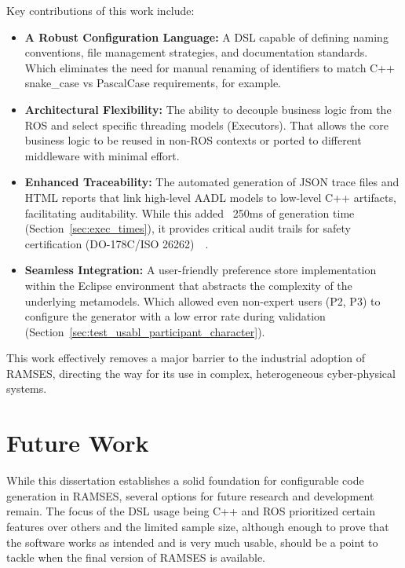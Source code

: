 Key contributions of this work include:

\begin{itemize} 
	\item \textbf{A Robust Configuration Language: } A \gls{DSL} capable of defining naming conventions, file management strategies, and documentation standards. Which eliminates the need for manual renaming of identifiers to match C++ snake\_case vs PascalCase requirements, for example.
	
	\item \textbf{Architectural Flexibility: } The ability to decouple business logic from the \gls{ROS} and select specific threading models (Executors). That allows the core business logic to be reused in non-\gls{ROS} contexts or ported to different middleware with minimal effort.
	
	\item \textbf{Enhanced Traceability: } The automated generation of \gls{JSON} trace files and \gls{HTML} reports that link high-level \gls{AADL} models to low-level C++ artifacts, facilitating auditability. While this added ~250ms of generation time (Section~\ref{sec:exec_times}), it provides critical audit trails for safety certification (DO-178C/\gls{ISO} 26262)~\cite{do178C}~\cite{iso26262}.
	
	\item \textbf{Seamless Integration: } A user-friendly preference store implementation within the Eclipse environment that abstracts the complexity of the underlying metamodels. Which allowed even non-expert users (P2, P3) to configure the generator with a low error rate during validation (Section~\ref{sec:test_usabl_participant_character}).
\end{itemize}

This work effectively removes a major barrier to the industrial adoption of \gls{RAMSES}, directing the way for its use in complex, heterogeneous cyber-physical systems.


\section{Future Work}
\label{sec:concl_future_work}

While this dissertation establishes a solid foundation for configurable code generation in \gls{RAMSES}, several options for future research and development remain. The focus of the \gls{DSL} usage being C++ and \gls{ROS} prioritized certain features over others and the limited sample size, although enough to prove that the software works as intended and is very much usable, should be a point to tackle when the final version of \gls{RAMSES} is available.



